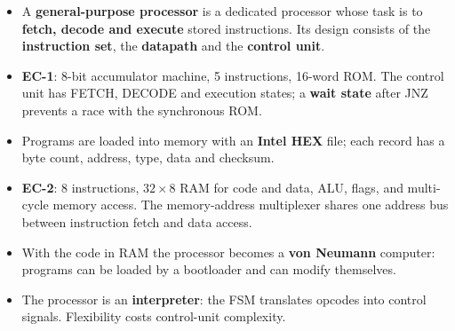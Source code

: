 \begin{chaptersummary}
\begin{itemize}
  \item A \textbf{general-purpose processor} is a dedicated processor whose task is to \textbf{fetch, decode and execute} stored instructions. Its design consists of the \textbf{instruction set}, the \textbf{datapath} and the \textbf{control unit}.
  \item \textbf{EC-1}: 8-bit accumulator machine, 5 instructions, 16-word ROM. The control unit has FETCH, DECODE and execution states; a \textbf{wait state} after JNZ prevents a race with the synchronous ROM.
  \item Programs are loaded into memory with an \textbf{Intel HEX} file; each record has a byte count, address, type, data and checksum.
  \item \textbf{EC-2}: 8 instructions, $32\times8$ RAM for code and data, ALU, flags, and multi-cycle memory access. The memory-address multiplexer shares one address bus between instruction fetch and data access.
  \item With the code in RAM the processor becomes a \textbf{von Neumann} computer: programs can be loaded by a bootloader and can modify themselves.
  \item The processor is an \textbf{interpreter}: the FSM translates opcodes into control signals. Flexibility costs control-unit complexity.
\end{itemize}
\end{chaptersummary}

